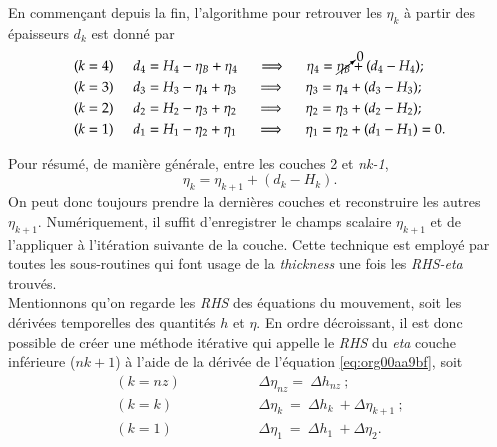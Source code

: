 \documentclass[10pt]{article}
\numberwithin{equation}{section}
\begin{document}
En commençant depuis la fin, l'algorithme pour retrouver les \(\eta_k\) à partir des épaisseurs \(d_k\) est donné par
\begin{align}
        & (k=4) \hspace{0.5cm} d_4 = H_4 - \eta_B + \eta_4 \hspace{0.5cm} \Longrightarrow \hspace{0.5cm} \eta_4 = \cancelto{0}{\eta_B} + (d_4 - H_4); \\
        & (k=3) \hspace{0.5cm} d_3 = H_3 - \eta_4 + \eta_3 \hspace{0.5cm} \Longrightarrow \hspace{0.5cm} \eta_3 =\eta_4+(d_3-H_3);\\
        & (k=2) \hspace{0.5cm} d_2 = H_2 - \eta_3 + \eta_2 \hspace{0.5cm} \Longrightarrow \hspace{0.5cm} \eta_2 =\eta_3+(d_2-H_2);\\
        & (k=1) \hspace{0.5cm} d_1 = H_1 - \eta_2 + \eta_1 \hspace{0.5cm} \Longrightarrow \hspace{0.5cm} \eta_1 =\eta_2+(d_1-H_1) = 0.
\end{align}

Pour résumé, de manière générale, entre les couches 2 et \emph{nk-1},
\begin{equation}
\label{eq:org00aa9bf}
\eta_k = \eta_{k+1} + (d_k - H_k).
\end{equation}
On peut donc toujours prendre la dernières couches et reconstruire les autres \(\eta_{k+1}\).
Numériquement, il suffit d'enregistrer le champs scalaire \(\eta_{k+1}\) et de l'appliquer à l'itération suivante de la couche.
Cette technique est employé par toutes les sous-routines qui font usage de la \emph{thickness} une fois les \emph{RHS-eta} trouvés.\\[0pt]


Mentionnons qu'on regarde les \emph{RHS} des équations du mouvement, soit les dérivées temporelles des quantités \(h\) et \(\eta\).
En ordre décroissant, il est donc possible de créer une méthode itérative qui appelle le \emph{RHS} du \emph{eta} couche inférieure (\(nk+1\)) à l'aide de la dérivée de l'équation \ref{eq:org00aa9bf}, soit
\begin{align}
(k=nz)\hspace{2cm}    &\Delta \eta_{nz} =\ \Delta h_{nz}\ ;\nonumber\\
(k=k) \hspace{2cm} &\Delta \eta_{k}\ = \ \Delta h_k\ + \Delta \eta_{k+1}\ ;\\
(k=1) \hspace{2cm} &\Delta \eta_1\ = \ \Delta h_1\ + \Delta \eta_2. \nonumber 
\end{align}
\end{document}
